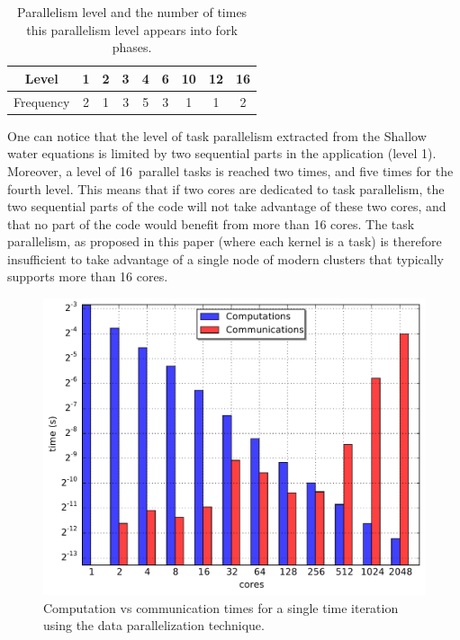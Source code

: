 \begin{table}[th]
 \begin{center}
 \begin{tabular}{|c|c|c|c|c|c|c|c|c|}
   Level & 1 & 2 & 3 & 4 & 6 & 10 & 12 & 16\\
   \hline
   Frequency & 2 & 1 & 3 & 5 & 3 & 1 & 1 & 2\\
 \end{tabular}
\caption{Parallelism level and the number of times this parallelism level appears into fork phases.}
\label{fig:freq}
 \end{center}
\end{table}

One can notice that the level of task parallelism extracted from the Shallow water equations is limited by two sequential parts in the application (level 1). Moreover, a level of 16~parallel tasks is reached two times, and five times for the fourth level.
This means that if two cores are dedicated to task parallelism, the two sequential parts of the code will not take advantage of these two cores, and that no part of the code would benefit from more than 16 cores. The task parallelism, as proposed in this paper (\ie where each kernel is a task) is therefore insufficient to take advantage of a single node of modern clusters that typically supports more than 16 cores.

\begin{figure}[th]\begin{center}
  \includegraphics[width=.6\textwidth]{../results/task_scaling/500_200/analytic/times.pdf}
  \caption{Computation vs communication times for a single time iteration using the data parallelization technique.}
  \label{fig:limit}
\end{center}\end{figure}

